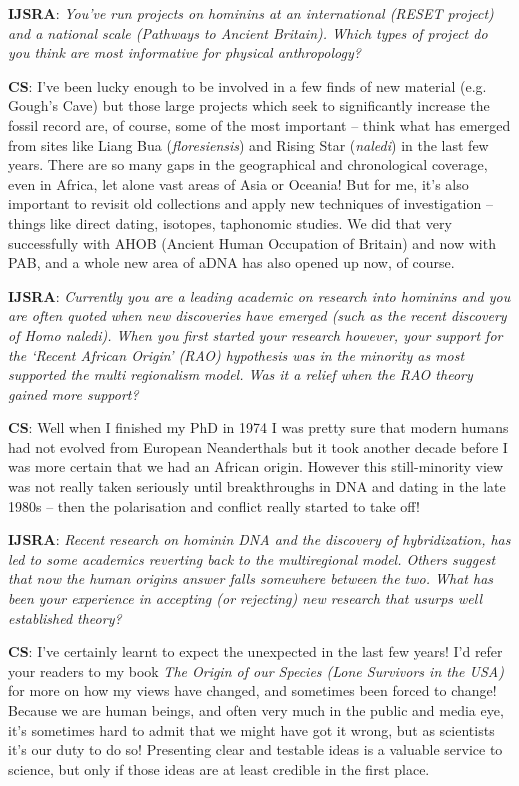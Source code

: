 \documentclass{ijsra}
\begin{document}
\textbf{IJSRA}: \textit{You’ve run projects on hominins at an international (RESET project) and a national scale (Pathways to Ancient Britain).
Which types of project do you think are most informative for physical anthropology?}

\textbf{CS}: I’ve been lucky enough to be involved in a few finds of new material (e.g. Gough’s Cave) but
those large projects which seek to significantly increase the fossil record are, of course,
some of the most important – think what has emerged from sites like Liang Bua (\textit{floresiensis}) and Rising Star (\textit{naledi})
in the last few years. 
There are so many gaps in the geographical and chronological coverage, even in Africa, let alone vast areas of Asia or Oceania!
But for me, it’s also important to revisit old collections and apply new techniques of investigation – things like direct dating,
isotopes, taphonomic studies. 
We did that very successfully with AHOB (Ancient Human Occupation of Britain) and now with PAB,
and a whole new area of aDNA has also opened up now, of course.

\textbf{IJSRA}: \textit{Currently you are a leading academic on research into hominins and you are often quoted when new discoveries
have emerged (such as the recent discovery of \textit{Homo naledi}). When you first started your research however,
your support for the ‘Recent African Origin’ (RAO) hypothesis was in the minority as most supported the multi regionalism model.
Was it a relief when the RAO theory gained more support?}

\textbf{CS}: Well when I finished my PhD in 1974 I was pretty sure that modern humans had not evolved from European Neanderthals but
it took another decade before I was more certain that we had an African origin.
However this still-minority view was not really taken seriously until breakthroughs in DNA and dating in the late
1980s – then the polarisation and conflict really started to take off!

\textbf{IJSRA}: \textit{Recent research on hominin DNA and the discovery of hybridization, has led to some academics reverting back to
the multiregional model. 
Others suggest that now the human origins answer falls somewhere between the two.
What has been your experience in accepting (or rejecting) new research that usurps well established theory?}

\textbf{CS}: I’ve certainly learnt to expect the unexpected in the last few years!
I’d refer your readers to my book \textit{The Origin of our Species (Lone Survivors in the USA)} for more on how my views have changed,
and sometimes been forced to change!
Because we are human beings, and often very much in the public and media eye, it’s sometimes hard to
admit that we might have got it wrong, but as scientists it’s our duty to do so!
Presenting clear and testable ideas is a valuable service to science, but only if those ideas are at least credible in the first place.
\end{document}
